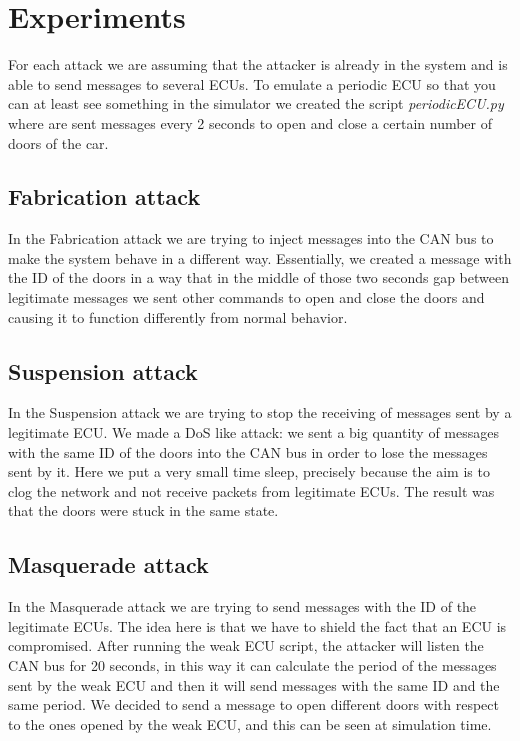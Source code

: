 \documentclass[12pt]{article}
\begin{document}
\section{Experiments}
For each attack we are assuming that the attacker is already in the system and is able to send messages to 
several ECUs. To emulate a periodic ECU so that you can at least see something in the simulator we created 
the script \textit{periodicECU.py} where are sent messages every 2 seconds to open and close a certain number of 
doors of the car.  
\subsection{Fabrication attack}
In the Fabrication attack we are trying to inject messages into the CAN bus to make the system behave in a 
different way. Essentially, we created a message with the ID of the doors in a way that in the middle of 
those two seconds gap between legitimate messages we sent other commands to open and close the doors and 
causing it to function differently from normal behavior.
\subsection{Suspension attack}
In the Suspension attack we are trying to stop the receiving of messages sent by a legitimate ECU. We made 
a DoS like attack: we sent a big quantity of messages with the same ID of the doors into the CAN bus in order 
to lose the messages sent by it. Here we put a very small time sleep, precisely because the aim is to clog 
the network and not receive packets from legitimate ECUs. The result was that the doors were stuck in the same 
state.
\subsection{Masquerade attack}
In the Masquerade attack we are trying to send messages with the ID of the legitimate ECUs. The idea here 
is that we have to shield the fact that an ECU is compromised. After running the weak ECU script, the 
attacker will listen the CAN bus for 20 seconds, in this way it can calculate the period of the messages 
sent by the weak ECU and then it will send messages with the same ID and the same period. We decided to 
send a message to open different doors with respect to the ones opened by the weak ECU, and this can be 
seen at simulation time.
\end{document}
